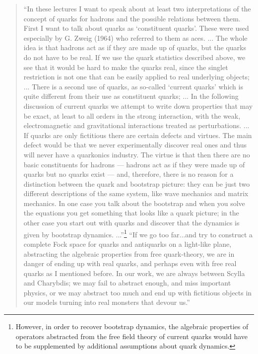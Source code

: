 \documentclass[12pt]{article}
\begin{document}
\begin{quote}
``In these lectures I want to speak about at least two interpretations of the concept of quarks for hadrons and the possible relations between them. First I want to talk about quarks as `constituent quarks'. These were used especially by G. Zweig (1964)
who referred to them as aces. ...
The whole idea is that hadrons act as if they are made up of quarks, but the quarks do not have to be real. If we use the quark statistics described above, we see that it would be hard to make the quarks real, since the singlet restriction is not one that can be easily applied to real underlying objects; ...
\newline
\newline
There is a second use of quarks, as so-called `current quarks' which is quite different from their use as constituent quarks; ...
In the following discussion of current quarks we attempt to write down properties that may be exact, at least to all orders in the strong interaction, with the weak, electromagnetic and gravitational interactions treated as perturbations. ...
\newline
\newline
If quarks are only fictitious there are certain defects and virtues. The main defect would be that we never experimentally discover real ones and thus will never have a quarkonics industry. The virtue is that then there are no basic constituents for hadrons --- hadrons act as if they were made up of quarks but no quarks exist --- and, therefore, there is no reason for a distinction between the quark and bootstrap picture: they can be just two different descriptions of the same system, like wave mechanics and matrix mechanics. In one case you talk about the bootstrap and when you solve the equations you get something that looks like a quark picture; in the other case you start out with quarks and discover that the dynamics is given by bootstrap dynamics. ...''\footnote{However, in order to recover bootstrap dynamics, the algebraic properties of operators abstracted from the free field theory of current quarks would have to be supplemented by additional assumptions about quark dynamics.}
\newline
\newline
``If we go too far...and try to construct a complete Fock space for quarks and antiquarks on a light-like plane, abstracting the algebraic properties from free quark-theory, we are in danger of ending up with real quarks, and perhaps even with free real quarks as I mentioned before. In our work, we are always between Scylla and Charybdis; we may fail to abstract enough, and miss important physics, or we may abstract too much and end up with fictitious objects in our models turning into real monsters that devour us.''
\end{quote}
\end{document}
